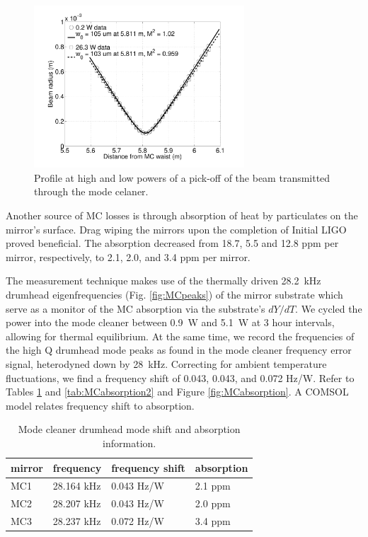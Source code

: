 \begin{figure}
\begin{centering}
\includegraphics[width=0.7\textwidth]{figures/MCTrans_datafit.pdf}
\caption{Profile at high and low powers of a pick-off of the beam
  transmitted through the mode celaner.}
\label{fig:MCtrans}
\end{centering}
\end{figure}

Another source of MC losses is through absorption of heat by
particulates on the mirror's surface. Drag wiping the mirrors upon the
completion of Initial LIGO proved beneficial. The absorption decreased
from 18.7, 5.5 and 12.8 ppm per mirror, respectively, to 2.1, 2.0, and 3.4 ppm
per mirror. 

The measurement technique makes use of the thermally driven 28.2~kHz
drumhead eigenfrequencies (Fig. \ref{fig:MCpeaks}) of the mirror
substrate which serve as a monitor of the MC absorption via the
substrate's $dY/dT$. We cycled the power into the mode cleaner between
0.9~W and 5.1~W at 3 hour intervals, allowing for thermal
equilibrium. At the same time, we record the frequencies of the high Q
drumhead mode peaks as found in the mode cleaner frequency error
signal, heterodyned down by 28~kHz. Correcting for ambient temperature
fluctuations, we find a frequency shift of 0.043, 0.043, and 0.072
Hz/W. Refer to Tables \ref{tab:MCabsorption} and \ref{tab:MCabsorption2} and Figure
\ref{fig:MCabsorption}. A COMSOL model relates frequency shift to
absorption.

\begin{table}
\caption{Mode cleaner drumhead mode shift and absorption information.}
\centering
\begin{tabular}{l l l l}
mirror & frequency & frequency shift & absorption \\
\hline\hline
MC1 & 28.164 kHz & 0.043 Hz/W & 2.1 ppm \\
MC2 & 28.207 kHz & 0.043 Hz/W & 2.0 ppm \\
MC3 & 28.237 kHz & 0.072 Hz/W & 3.4 ppm \\
\hline
\end{tabular}
\label{tab:MCabsorption}
\end{table}

